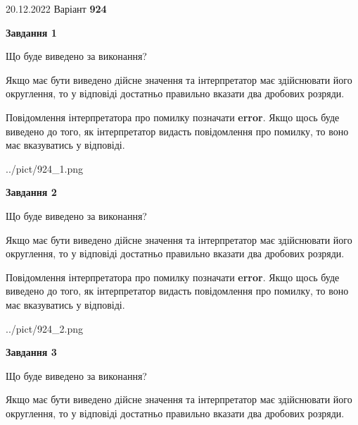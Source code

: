 \documentclass[12pt, ukrainian]{article}
\begin{document}
{20.12.2022 Варіант \No \textbf { 924 }\par}
{
\begin {Large}

{\begin {center}\textbf{Завдання 1}\end {center}}\par
Що буде виведено за виконання? \par

Якщо має бути виведено дійсне значення та інтерпретатор має здійснювати його округлення, 
то у відповіді достатньо правильно вказати два дробових розряди.

Повідомлення інтерпретатора про помилку позначати \textbf{error}.
Якщо щось буде виведено до того, як інтерпретатор видасть повідомлення про помилку, 
то воно має вказуватись у відповіді. \par

\begin{center}
	{../pict/924_1.png}
\end{center}
\newpage

{\begin {center}\textbf{Завдання 2}\end {center}}\par
Що буде виведено за виконання? \par

Якщо має бути виведено дійсне значення та інтерпретатор має здійснювати його округлення, 
то у відповіді достатньо правильно вказати два дробових розряди.

Повідомлення інтерпретатора про помилку позначати \textbf{error}.
Якщо щось буде виведено до того, як інтерпретатор видасть повідомлення про помилку, 
то воно має вказуватись у відповіді. \par

\begin{center}
	{../pict/924_2.png}
\end{center}
\newpage

{\begin {center}\textbf{Завдання 3}\end {center}}\par
Що буде виведено за виконання? \par

Якщо має бути виведено дійсне значення та інтерпретатор має здійснювати його округлення, 
то у відповіді достатньо правильно вказати два дробових розряди.


\end{Large}}
\end{document}
